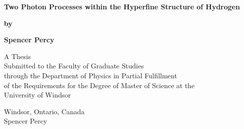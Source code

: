 \begin{titlepage}
    \begin{center}
        \vspace*{1cm}
        \Huge
        \textbf{Two Photon Processes within the Hyperfine Structure of Hydrogen}
        
        \vspace{0.5cm}
        \large
              \textbf{by}

        
        \vspace{0.5cm}
        \large
        \textbf{Spencer Percy}
        
        \vfill
        
        A Thesis\\
        Submitted to the Faculty of Graduate Studies\\
        through the Department of Physics in Partial Fulfillment\\
        of the Requirements for the Degree of Master of Science at the\\
        University of Windsor
        
        \vspace{0.8cm}
        

        Windsor, Ontario, Canada\\
         Spencer Percy
        
    \end{center}
\end{titlepage}